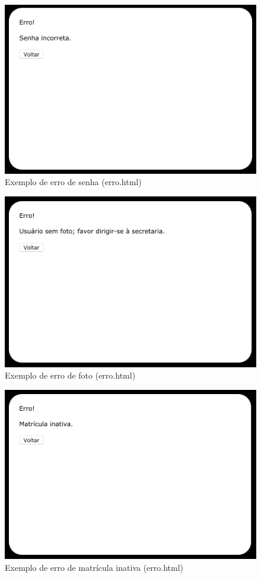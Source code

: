 \documentclass[12pt]{article}
\begin{document}
\begin{figure}[ht]
\centering
\includegraphics[width=.5\textwidth]{fig4.png}
\caption{Exemplo de erro de senha (erro.html)}
\label{fig:exampleFig4}
\end{figure}

\begin{figure}[ht]
\centering
\includegraphics[width=.5\textwidth]{fig5.png}
\caption{Exemplo de erro de foto (erro.html)}
\label{fig:exampleFig5}
\end{figure}

\begin{figure}[ht]
\centering
\includegraphics[width=.5\textwidth]{fig6.png}
\caption{Exemplo de erro de matrícula inativa (erro.html)}
\label{fig:exampleFig6}
\end{figure}
\end{document}
